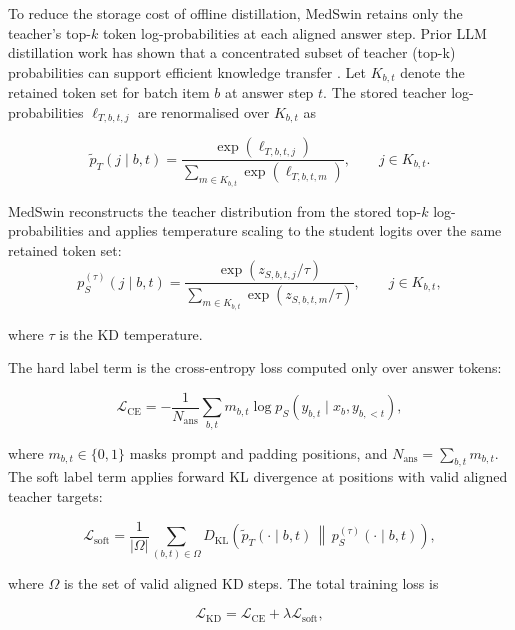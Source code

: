 \documentclass[conference]{IEEEtran}
\begin{document}
To reduce the storage cost of offline distillation, MedSwin retains only the teacher's top-$k$ token log-probabilities at each aligned answer step. Prior LLM distillation work has shown that a concentrated subset of teacher (top-k) probabilities can support efficient knowledge transfer \cite{shum2024first}. Let $K_{b,t}$ denote the retained token set for batch item $b$ at answer step $t$. The stored teacher log-probabilities $\ell_{T,b,t,j}$ are renormalised over $K_{b,t}$ as

\begin{equation}
\widetilde{p}_{T}(j\mid b,t)
=
\frac{\exp\!\left(\ell_{T,b,t,j}\right)}
{\sum\limits_{m\in K_{b,t}}
 \exp\!\left(\ell_{T,b,t,m}\right)},
\qquad j\in K_{b,t}.
\label{eq:kd-teacher-topk}
\end{equation}

MedSwin reconstructs the teacher distribution from the stored top-$k$ log-probabilities and applies temperature scaling to the student logits over the same retained token set:
\begin{equation}
p_{S}^{(\tau)}(j\mid b,t)
=
\frac{\exp\!\left(z_{S,b,t,j}/\tau\right)}
{\sum\limits_{m\in K_{b,t}}
 \exp\!\left(z_{S,b,t,m}/\tau\right)},
\qquad j\in K_{b,t},
\label{eq:kd-student-topk}
\end{equation}

where $\tau$ is the KD temperature.

The hard label term is the cross-entropy loss computed only over answer tokens:

\begin{equation}
\mathcal{L}_{\mathrm{CE}}
=
-\frac{1}{N_{\mathrm{ans}}}
\sum_{b,t}
m_{b,t}
\log p_{S}
\left(
y_{b,t}\mid x_b,y_{b,<t}
\right),
\label{eq:kd-ce}
\end{equation}

where $m_{b,t}\in\{0,1\}$ masks prompt and padding positions, and $N_{\mathrm{ans}}=\sum_{b,t}m_{b,t}$. The soft label term applies forward KL divergence at positions with valid aligned teacher targets:

\begin{equation}
\mathcal{L}_{\mathrm{soft}}
=
\frac{1}{|\Omega|}
\sum_{(b,t)\in\Omega}
D_{\mathrm{KL}}
\left(
\widetilde{p}_{T}(\cdot\mid b,t)
\,\middle\|\,
p_{S}^{(\tau)}(\cdot\mid b,t)
\right),
\label{eq:kd-soft}
\end{equation}

where $\Omega$ is the set of valid aligned KD steps. The total training loss is

\begin{equation}
\mathcal{L}_{\mathrm{KD}}
=
\mathcal{L}_{\mathrm{CE}}
+
\lambda\mathcal{L}_{\mathrm{soft}},
\label{eq:kd-total}
\end{equation}
\end{document}
